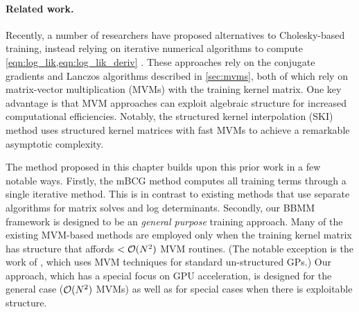 \paragraph{Related work.}
Recently, a number of researchers have proposed alternatives to Cholesky-based training, instead relying on iterative numerical algorithms to compute \cref{eqn:log_lik,eqn:log_lik_deriv} \cite{cunningham2008fast,murray2009gaussian,saatcci2012scalable,wilson2014thesis,wilson2015kernel,cutajar2016preconditioning,dong2017scalable,gardner2018product}.
These approaches rely on the conjugate gradients and Lanczos algorithms described in \cref{sec:mvms}, both of which rely on matrix-vector multiplication (MVMs) with the training kernel matrix.
One key advantage is that MVM approaches can exploit algebraic structure for increased computational efficiencies.
Notably, the structured kernel interpolation (SKI) method \cite{wilson2015kernel} uses structured kernel matrices with fast MVMs to achieve a remarkable asymptotic complexity.

The method proposed in this chapter builds upon this prior work in a few notable ways.
Firstly, the mBCG method computes all training terms through a single iterative method.
This is in contrast to existing methods that use separate algorithms for matrix solves and log determinants.
Secondly, our BBMM framework is designed to be an \emph{general purpose} training approach.
Many of the existing MVM-based methods are employed only when the training kernel matrix has structure that affords $< \bigo{N^2}$ MVM routines.
(The notable exception is the work of \citet{cutajar2016preconditioning}, which uses MVM techniques for standard un-structured GPs.)
Our approach, which has a special focus on GPU acceleration, is designed for the general case ($\bigo{N^2}$ MVMs) as well as for special cases when there is exploitable structure.
